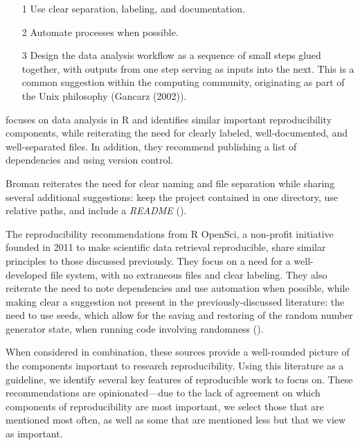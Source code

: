 \documentclass[APA,LATO1COL]{WileyNJD-v2}
\begin{document}
\begin{itemize}
\item[1] Use clear separation, labeling, and documentation.
\item[2] Automate processes when possible.
\item[3] Design the data analysis workflow as a sequence of small steps glued together, with
outputs from one step serving as inputs into the next. This is a common suggestion within the computing community, originating as part of the Unix philosophy (Gancarz (2002)).
\end{itemize}


\cite{cooper2017guide} focuses on data analysis in R and identifies similar important reproducibility components, while reiterating the need for clearly labeled, well-documented, and well-separated files. In addition, they recommend publishing a list of dependencies and using version control.

Broman reiterates the need for clear naming and file separation while sharing several additional suggestions: keep the project contained in one directory, use relative paths, and include a \textit{README} (\cite{broman}).

The reproducibility recommendations from R OpenSci, a non-profit initiative founded in 2011 to make scientific data retrieval reproducible, share similar principles to those discussed previously. They focus on a need for a well-developed file system, with no extraneous files and clear labeling. They also reiterate the need to note dependencies and use automation when possible, while making clear a suggestion not present in the previously-discussed literature: the need to use seeds, which allow for the saving and restoring of the random number generator state, when running code involving randomness (\cite{r-opensci}).

When considered in combination, these sources provide a well-rounded picture of the components important to research reproducibility. Using this literature as a guideline, we identify several key features of reproducible work to focus on. These recommendations are opinionated—due to the lack of agreement on which components of reproducibility are most important, we select those that are mentioned most often, as well as some that are mentioned less but that we view as important.

\vskip 0.5in
\end{document}
